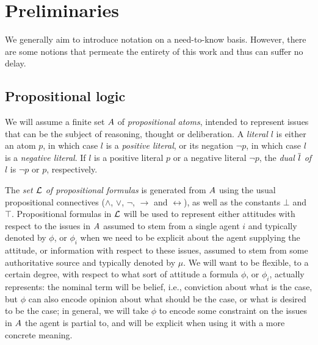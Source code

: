 \chapter{Preliminaries}\label{ch:2}
We generally aim to introduce notation on a need-to-know basis.
However, there are some notions that permeate the entirety of this work and 
thus can suffer no delay.
























\section{Propositional logic}\label{sec:2-prop-logic}
We will assume a finite set 
$A$ of \emph{propositional atoms},
intended to represent issues that can be 
the subject of reasoning, thought or deliberation.
A \emph{literal $l$} is either an atom $p$, 
in which case $l$ is a \emph{positive literal},
or its negation $\lnot p$, in which case $l$ is a \emph{negative literal}.
If $l$ is a positive literal $p$ or a negative literal $\lnot p$, 
the \emph{dual $\overline{l}$ of $l$} is $\lnot p$ or $p$, respectively.

The \emph{set $\mathcal{L}$ of propositional formulas} is generated from $A$
using the usual propositional connectives ($\land$, $\lor$, $\lnot$, $\rightarrow$ and $\leftrightarrow$),
as well as the constants $\bot$ and $\top$. 
Propositional formulas in $\mathcal{L}$	will be used to represent either 
attitudes with respect to the issues in $A$ 
assumed to stem from a single agent $i$
and typically denoted by $\phi$, 
or $\phi_{i}$ when we need to be explicit about the agent 
supplying the attitude, 
or information with respect to these issues,
assumed to stem from some authoritative source 
and typically denoted by $\mu$.
We will want to be flexible, to a certain degree, 
with respect to what sort of attitude a formula 
$\phi$, or $\phi_{i}$, actually represents:
the nominal term will be belief, i.e., conviction about what is the case,
but $\phi$ can also encode opinion about what should be the case,
or what is desired to be the case;
in general, we will take $\phi$ to encode some constraint 
on the issues in $A$ the agent is partial to,
and will be explicit when using it with a more concrete meaning.

